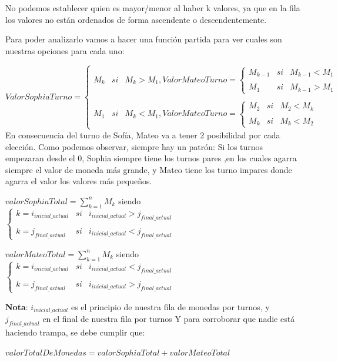 No podemos establecer quien es mayor/menor al haber k valores, ya que en la fila los valores no están ordenados de forma ascendente o descendentemente.

Para poder analizarlo vamos a hacer una función partida para ver cuales son nuestras opciones para cada uno:

$ValorSophiaTurno= \left\{ \begin{array}{lcc} M_{k} & si & M_{k}>M_{1} , ValorMateoTurno= \left\{ \begin{array}{lcc} M_{k-1} & si & M_{k-1}<M_{1} \\ \\ M_{1} & si & M_{k-1} > M_{1} \end{array} \right. \\ \\ M_{1} & si & M_{k} < M_{1}, ValorMateoTurno= \left\{ \begin{array}{lcc} M_{2} & si & M_{2}<M_{k} \\ \\ M_{k} & si & M_{k} < M_{2} \end{array} \right. \end{array} \right.$
\vskip0.3cm
En consecuencia del turno de Sofía, Mateo va a tener 2 posibilidad por cada elección.
\vskip0.7cm
Como podemos observar, siempre hay un patrón: Si los turnos empezaran desde el 0, Sophia siempre tiene los turnos pares
,en los cuales agarra siempre el valor de moneda más grande, y Mateo tiene los turno impares donde agarra el valor los valores más pequeños.

\vskip0.5cm

\vskip0.5cm
$valorSophiaTotal =  \sum_{k=1}^{n}M_{k}$ siendo $\left\{ \begin{array}{lcc} k=i_{inicial\_actual} & si & i_{inicial\_actual}>j_{final\_actual} \\ \\ k=j_{final\_actual} & si & i_{inicial\_actual}<j_{final\_actual} \end{array} \right.$

\vskip0.5cm
$valorMateoTotal =  \sum_{k=1}^{n}M_{k}$ siendo $\left\{ \begin{array}{lcc} k=i_{inicial\_actual} & si & i_{inicial\_actual}<j_{final\_actual} \\ \\ k=j_{final\_actual} & si & i_{inicial\_actual}>j_{final\_actual} \end{array} \right.$

\vskip0.5cm
\textbf{Nota}: $i_{inicial\_actual}$ es el principio de nuestra fila de monedas por turnos, y $j_{final\_actual}$ en el final de nuestra fila por turnos 
\vskip0.8cm
Y para corroborar que nadie está haciendo trampa, se debe cumplir que:
\vskip0.5cm
\begin{center}
    $valorTotalDeMonedas=valorSophiaTotal+valorMateoTotal$
\end{center}


